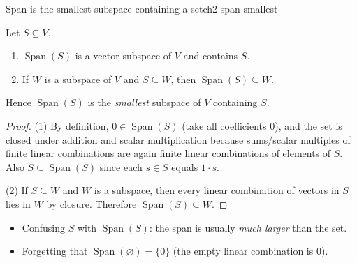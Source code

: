 \begin{theorem}{Span is the smallest subspace containing a set}{ch2-span-smallest}

Let $S\subseteq V$.

\begin{enumerate}

\item $\operatorname{Span}(S)$ is a vector subspace of $V$ and contains $S$.

\item If $W$ is a subspace of $V$ and $S\subseteq W$, then $\operatorname{Span}(S)\subseteq W$.

\end{enumerate}

Hence $\operatorname{Span}(S)$ is the \emph{smallest} subspace of $V$ containing $S$.

\begin{proof}

(1) By definition, $0\in\operatorname{Span}(S)$ (take all coefficients $0$), and the set is closed under addition and scalar multiplication because sums/scalar multiples of finite linear combinations are again finite linear combinations of elements of $S$. Also $S\subseteq \operatorname{Span}(S)$ since each $s\in S$ equals $1\cdot s$.

(2) If $S\subseteq W$ and $W$ is a subspace, then every linear combination of vectors in $S$ lies in $W$ by closure. Therefore $\operatorname{Span}(S)\subseteq W$.

\end{proof}

\end{theorem}

\begin{commonmistake}

\begin{itemize}

\item Confusing $S$ with $\operatorname{Span}(S)$: the span is usually \emph{much larger} than the set.

\item Forgetting that $\operatorname{Span}(\varnothing)=\{0\}$ (the empty linear combination is $0$).

\end{itemize}

\end{commonmistake}


